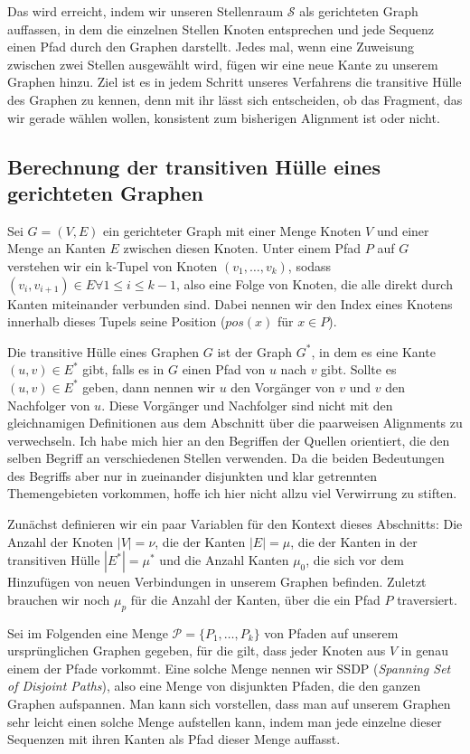 Das wird erreicht, indem wir unseren Stellenraum $\mathcal{S}$ als gerichteten Graph auffassen, in dem die einzelnen Stellen Knoten entsprechen und jede Sequenz einen Pfad durch den Graphen darstellt. Jedes mal, wenn eine Zuweisung zwischen zwei Stellen ausgewählt wird, fügen wir eine neue Kante zu unserem Graphen hinzu. Ziel ist es in jedem Schritt unseres Verfahrens die transitive Hülle des Graphen zu kennen, denn mit ihr lässt sich entscheiden, ob das Fragment, das wir gerade wählen wollen, konsistent zum bisherigen Alignment ist oder nicht.

\subsection{Berechnung der transitiven Hülle eines gerichteten Graphen}

Sei $G=(V,E)$ ein gerichteter Graph mit einer Menge Knoten $V$ und einer Menge an Kanten $E$ zwischen diesen Knoten. Unter einem Pfad $P$ auf $G$ verstehen wir ein k-Tupel von Knoten $(v_1, \dots, v_k)$, sodass $(v_i, v_{i+1}) \in E \forall 1 \leq i \leq k-1$, also eine Folge von Knoten, die alle direkt durch Kanten miteinander verbunden sind. Dabei nennen wir den Index eines Knotens innerhalb dieses Tupels seine Position ($pos(x)$ für $x \in P$).

Die transitive Hülle eines Graphen $G$ ist der Graph $G^*$, in dem es eine Kante $(u,v) \in E^*$ gibt, falls es in $G$ einen Pfad von $u$ nach $v$ gibt. Sollte es $(u,v) \in E^*$ geben, dann nennen wir $u$ den Vorgänger von $v$ und $v$ den Nachfolger von $u$. Diese Vorgänger und Nachfolger sind nicht mit den gleichnamigen Definitionen aus dem Abschnitt über die paarweisen Alignments zu verwechseln. Ich habe mich hier an den Begriffen der Quellen orientiert, die den selben Begriff an verschiedenen Stellen verwenden. Da die beiden Bedeutungen des Begriffs aber nur in zueinander disjunkten und klar getrennten Themengebieten vorkommen, hoffe ich hier nicht allzu viel Verwirrung zu stiften. 

Zunächst definieren wir ein paar Variablen für den Kontext dieses Abschnitts: Die Anzahl der Knoten $|V| = \nu$, die der Kanten $|E| = \mu$, die der Kanten in der transitiven Hülle $|E^*| = \mu^*$ und die Anzahl Kanten $\mu_0$, die sich vor dem Hinzufügen von neuen Verbindungen in unserem Graphen befinden. Zuletzt brauchen wir noch $\mu_p$ für die Anzahl der Kanten, über die ein Pfad $P$ traversiert.

Sei im Folgenden eine Menge $\mathcal{P} = \{P_1, \dots, P_k\}$ von Pfaden auf unserem ursprünglichen Graphen gegeben, für die gilt, dass jeder Knoten aus $V$ in genau einem der Pfade vorkommt. Eine solche Menge nennen wir SSDP (\emph{Spanning Set of Disjoint Paths}), also eine Menge von disjunkten Pfaden, die den ganzen Graphen aufspannen. Man kann sich vorstellen, dass man auf unserem Graphen sehr leicht einen solche Menge aufstellen kann, indem man jede einzelne dieser Sequenzen mit ihren Kanten als Pfad dieser Menge auffasst. 

